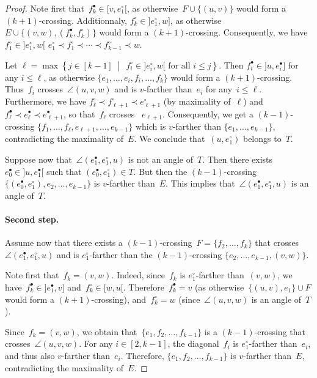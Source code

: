 \documentclass{amsart}
\theoremstyle{remark}
\newcommand{\set}[2]{\left\{ #1 \;\middle|\; #2 \right\}} %
\newcommand{\cl}{\prec}
\begin{document}
\begin{proof}
Note first that~$f^\bullet_k \in [v, e^\circ_1[$, as otherwise~$F \cup \{(u, v)\}$ would form a $(k + 1)$-crossing.
Additionnaly, $f^\circ_k \in {]e^\circ_1, w]}$, as otherwise $E \cup \{(v,w), (f^\bullet_k, f^\circ_k)\}$ would form a $(k + 1)$-crossing. 
Consequently, we have~$f^\circ_1 \in {]e^\circ_1, w[}$ $e^\circ_1 \cl f^\circ_1 \cl \cdots \cl f^\circ_{k-1} \cl w$.

Let $\ell = \max \set{j\in[k-1]}{\, f^\circ_i \in {]e^\circ_i, w[} \text{ for all } i \le j}$.
Then $f^\bullet_i \in {]u, e^\bullet_i]}$ for any $i \le \ell$, as otherwise $\{e_1, \dots , e_i, f_i, \dots , f_k\}$ would form a $(k + 1)$-crossing.
Thus~$f_i$ crosses~$\angle(u,v,w)$ and is $v$-farther than~$e_i$ for any~$i \le \ell$.
Furthermore, we have $f^\circ_\ell \cl f^\circ_{\ell+1} \cl e^\circ_{\ell+1}$ (by maximality of~$\ell$) and~$f^\bullet_\ell \cl e^\bullet_{\ell} \cl e^\bullet_{\ell+1}$, so that~$f_\ell$ crosses~
$e_{\ell+1}$. 
Consequently, we get a $(k-1)$-crossing $\{f_1, \dots , f_\ell, e_{\ell+1}, \dots , e_{k-1}\}$ which is $v$-farther than $\{e_1, \dots , e_{k-1}\}$, contradicting the maximality of~$E$. 
We conclude that~$(u, e^\circ_1)$ belongs to~$T$.

Suppose now that~$\angle(e^\bullet_1, e^\circ_1, u)$ is not an angle of~$T$. 
Then there exists $e^\bullet_0 \in {]u, e^\bullet_1[}$ such that $(e^\bullet_0, e^\circ_1) \in T$. 
But then the $(k-1)$-crossing $\{(e^\bullet_0, e^\circ_1), e_2, \dots, e_{k-1}\}$ is $v$-farther than~$E$. 
This implies that~$\angle(e^\bullet_1, e^\circ_1, u)$ is an angle of~$T$.

\medskip
\paragraph{\bf Second step.}
Assume now that there exists a $(k-1)$-crossing~$F=\{f_2, \dots , f_k\}$ that crosses $\angle(e^\bullet_1, e^\circ_1, u)$ and is $e^\circ_1$-farther than the $(k-1)$-crossing $\{e_2, \dots, e_{k-1}, (v, w)\}$.

Note first that~$f_k = (v,w)$. Indeed, since~$f_k$ is $e^\circ_1$-farther than~$(v,w)$, we have~$f^\bullet_k \in {]e^\bullet_1, v]}$ and~$f^\circ_k \in [w,u[$. Therefore~$f^\bullet_k = v$ (as otherwise~$\{(u,v), e_1\} \cup F$ would form a $(k+1)$-crossing), and~$f^\circ_k = w$ (since~$\angle(u,v,w)$ is an angle of~$T$).

Since~$f_k = (v,w)$, we obtain that~$\{e_1, f_2, \dots, f_{k-1}\}$ is a $(k-1)$-crossing that crosses~$\angle(u,v,w)$. For any $i \in [2,k-1]$, the diagonal~$f_i$ is $e^\circ_1$-farther than~$e_i$, and thus also $v$-farther than~$e_i$. Therefore, $\{e_1, f_2, \dots, f_{k-1}\}$ is $v$-farther than~$E$, contradicting the maximality of~$E$.
\end{proof}
\end{document}
